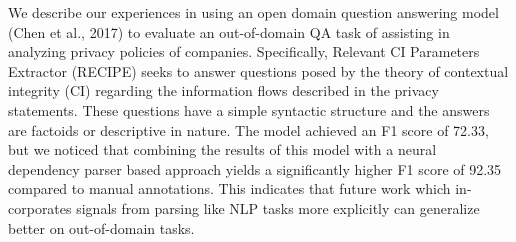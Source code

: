 We   describe   our   experiences   in   using  an  open  domain  question  answering model  (Chen  et  al.,  2017)  to  evaluate  an out-of-domain  QA  task  of  assisting  in analyzing  privacy  policies  of  companies. Specifically,  Relevant  CI  Parameters  Extractor  (RECIPE)  seeks  to  answer  questions  posed  by  the  theory  of  contextual integrity  (CI)  regarding  the  information flows described in the privacy statements. These  questions  have  a  simple  syntactic structure  and  the  answers  are  factoids  or descriptive in nature. The model achieved an F1 score of 72.33, but we noticed that combining the results of this model with a neural dependency parser based approach yields  a  significantly  higher  F1  score  of 92.35  compared  to  manual  annotations. This indicates that future work which in-corporates signals from parsing like NLP tasks more explicitly can generalize better on out-of-domain tasks.
